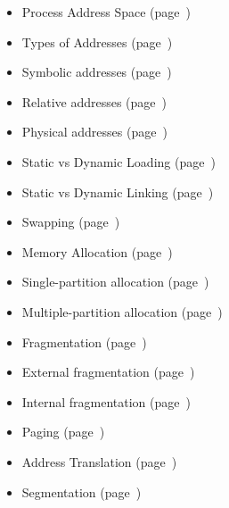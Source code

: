 \documentclass[doc,natbib,12pt]{apa6}
\begin{document}
	\begin{itemize}
		\item Process Address Space (page~\pageref{chp:processAddressSpace})
		
		\item Types of Addresses (page~\pageref{chp:typesAddresses})
		
		\item Symbolic addresses (page~\pageref{chp:symbolicAddress})
		
		\item Relative addresses (page~\pageref{chp:relativeAddress})
		
		\item  Physical addresses (page~\pageref{chp:physicalAddress})
		
		\item  Static vs Dynamic Loading (page~\pageref{chp:staticDynamicLoading})
		
		\item  Static vs Dynamic Linking (page~\pageref{chp:staticDynamicLinking})
		
		\item Swapping (page~\pageref{chp:swapping})
		
		\item  Memory Allocation (page~\pageref{chp:memoryAllocation})
		
		\item   Single-partition allocation (page~\pageref{chp:singlePartitionAllocation})
		
		\item   Multiple-partition allocation (page~\pageref{chp:MultiplePartitionAllocation})
		
		\item  Fragmentation (page~\pageref{chp:fragmentation})
		
		\item   External fragmentation (page~\pageref{chp:externalFragmentation})
		
		\item   Internal fragmentation (page~\pageref{chp:internalFragmentation})
		
		\item  Paging (page~\pageref{chp:paging})
		
		\item  Address Translation (page~\pageref{chp:addressTranslation})
		
		\item  Segmentation (page~\pageref{chp:segmentation})
		
	\end{itemize}
	
\end{document}
